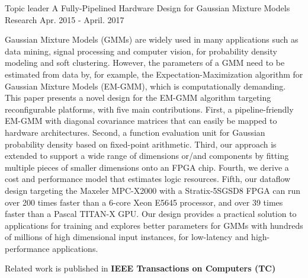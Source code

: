 \documentclass[11pt, a4paper]{awesome-cv}
\begin{document}
\begin{cventries}
  \cventry
    {Topic leader} %
    {A Fully-Pipelined Hardware Design for Gaussian Mixture Models} %
    {Research} %
    {Apr. 2015 - April. 2017} %
    {
      \begin{cvitems} %
        \item {Gaussian Mixture Models (GMMs) are widely used in many applications such as data mining, signal processing and computer vision, for probability density modeling and soft clustering. However, the parameters of a GMM need to be estimated from data by, for example, the Expectation-Maximization algorithm for Gaussian Mixture Models (EM-GMM), which is computationally demanding. This paper presents a novel design for the EM-GMM algorithm targeting reconfigurable platforms, with five main contributions.  First, a pipeline-friendly EM-GMM with diagonal covariance matrices that can easily be mapped to hardware architectures. Second, a function evaluation unit for Gaussian probability density based on fixed-point arithmetic. Third, our approach is extended to support a wide range of dimensions or/and components by fitting multiple pieces of smaller dimensions onto an FPGA chip. Fourth, we derive a cost and performance model that estimates logic resources. Fifth, our dataflow design targeting the Maxeler MPC-X2000 with a Stratix-5SGSD8 FPGA can run over 200 times faster than a 6-core Xeon E5645 processor, and over 39 times faster than a Pascal TITAN-X GPU.  Our design provides a practical solution to applications for training and explores better parameters for GMMs with hundreds of millions of high dimensional input instances, for low-latency and high-performance applications.}
        \item {Related work is published in \textbf{IEEE Transactions on Computers (TC)}}
      \end{cvitems}
    }



\end{cventries}
\end{document}
